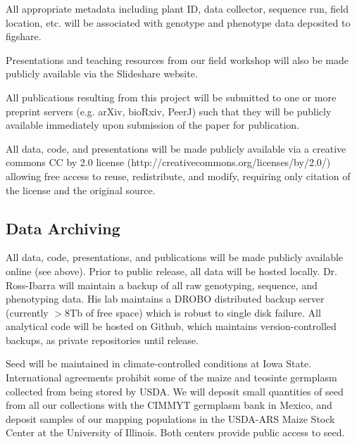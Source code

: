 All appropriate metadata including plant ID, data collector, sequence run, field location, etc. will be associated with genotype and phenotype data deposited to figshare. 

Presentations and teaching resources from our field workshop will also be made publicly available via the Slideshare website.

All publications resulting from this project will be submitted to one or more preprint servers (e.g. arXiv, bioRxiv, PeerJ) such that they will be publicly available immediately upon submission of the paper for publication.

All data, code, and presentations will be made publicly available via a creative commons CC by 2.0 license (http://creativecommons.org/licenses/by/2.0/) allowing free access to reuse, redistribute, and modify, requiring only citation of the license and the original source.

\subsection*{Data Archiving}

All data, code, presentations, and publications will be made publicly available online (see above).  Prior to public release, all data will be hosted locally.  Dr. Ross-Ibarra will maintain a backup of all raw genotyping, sequence, and phenotyping data.  His lab maintains a DROBO distributed backup server (currently $>8$Tb of free space) which is robust to single disk failure. All analytical code will be hosted on Github, which maintains version-controlled backups, as private repositories until release. 

Seed will be maintained in climate-controlled conditions at Iowa State. International agreements prohibit some of the maize and teosinte germplasm collected from being stored by USDA.  We will deposit small quantities of seed from all our collections with the CIMMYT germplasm bank in Mexico, and deposit samples of our mapping populations in the USDA-ARS Maize Stock Center at the University of Illinois.  Both centers provide public access to seed.


